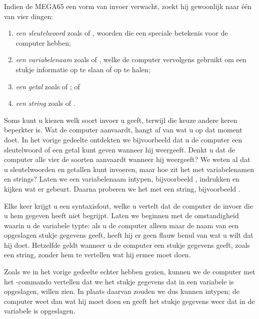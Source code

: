 Indien de MEGA65 een vorm van invoer verwacht, zoekt hij gewoonlijk naar één van vier dingen:

\begin{enumerate}
\item {\em een sleutelwoord} zoals  of , woorden die een speciale betekenis voor de computer hebben;\item {\em een variabelenaam} zoals  of , welke de computer vervolgens gebruikt om een stukje informatie op te slaan of op te halen;\item {\em een getal} zoals  of ; of\item {\em een string} zoals  of .
\end{enumerate}

\needspace{4cm} %
Soms kunt u kiezen welk soort invoer u geeft, terwijl die keuze andere keren beperkter is. Wat de computer aanvaardt, hangt af van wat u op dat moment doet. In het vorige gedeelte ontdekten we bijvoorbeeld dat u de computer een sleutelwoord of een getal kunt geven wanneer hij  weergeeft. Denkt u dat de computer alle vier de soorten aanvaardt wanneer hij  weergeeft? We weten al dat u sleutelwoorden en getallen kunt invoeren, maar hoe zit het met variabelenamen en strings? Laten we een variabelenaam intypen, bijvoorbeeld ,  indrukken en kijken wat er gebeurt. Daarna proberen we het met een string, bijvoorbeeld .


Elke keer krijgt u een syntaxisfout, welke u vertelt dat de computer de invoer die u hem gegeven heeft niet begrijpt. Laten we beginnen met de omstandigheid waarin u de variabele typte: als u de computer alleen maar de naam van een opgeslagen stukje gegevens geeft, heeft hij er geen flauw benul van wat u wilt dat hij doet. Hetzelfde geldt wanneer u de computer een stukje gegevens geeft, zoals een string, zonder hem te vertellen wat hij ermee moet doen.

Zoals we in het vorige gedeelte echter hebben gezien, kunnen we de computer met het -commando vertellen dat we het stukje gegevens dat in een variabele is opgeslagen, willen zien. In plaats daarvan zouden we dus  kunnen intypen; de computer weet dan wat hij moet doen en geeft het stukje gegevens weer dat in de variabele  is opgeslagen.

